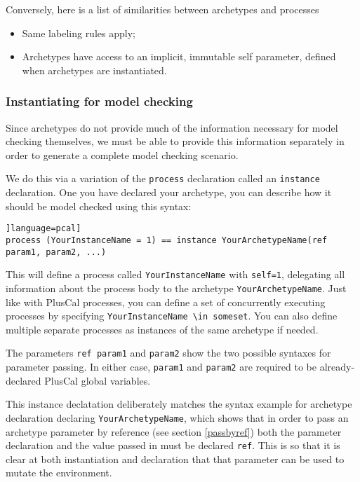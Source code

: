 Conversely, here is a list of similarities between archetypes and processes
\begin{itemize}
    \item Same labeling rules apply;
    \item Archetypes have access to an implicit, immutable self parameter, defined when archetypes are instantiated.
\end{itemize}

\subsubsection{Instantiating for model checking}

Since archetypes do not provide much of the information necessary for model checking themselves, we must be able to provide this information separately in order to generate a complete model checking scenario.

We do this via a variation of the \lstinline|process| declaration called an \lstinline|instance| declaration. One you have declared your archetype, you can describe how it should be model checked using this syntax:

\begin{lstlisting}]language=pcal]
process (YourInstanceName = 1) == instance YourArchetypeName(ref param1, param2, ...)
\end{lstlisting}

This will define a process called \lstinline|YourInstanceName| with \lstinline|self=1|, delegating all information about the process body to the archetype \lstinline|YourArchetypeName|. Just like with PlusCal processes, you can define a set of concurrently executing processes by specifying \lstinline[language=pcal]|YourInstanceName \in someset|. You can also define multiple separate processes as instances of the same archetype if needed.

The parameters \lstinline|ref param1| and \lstinline|param2| show the two possible syntaxes for parameter passing. In either case, \lstinline|param1| and \lstinline|param2| are required to be already-declared PlusCal global variables.

This instance declatation deliberately matches the syntax example for archetype declaration declaring \lstinline|YourArchetypeName|, which shows that in order to pass an archetype parameter by reference (see section \ref{passbyref}) both the parameter declaration and the value passed in must be declared \lstinline|ref|. This is so that it is clear at both instantiation and declaration that that parameter can be used to mutate the environment.

